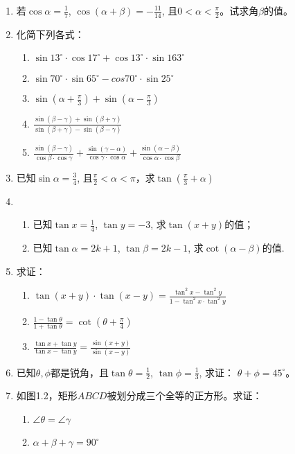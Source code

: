 \begin{enumerate}
\item 若$\cos\alpha=\frac{1}{7}$, $\cos(\alpha+\beta)=-\frac{11}{14}$, 且$0<\alpha<\frac{\pi}{2}$。试求角$\beta$的值。

\item 化简下列各式：
\begin{enumerate}
    \item $\sin13^{\circ}\cdot\cos17^{\circ}+\cos13^{\circ}\cdot \sin163^{\circ}$
    \item $\sin70^{\circ}\cdot\sin65^{\circ}-cos70^{\circ}\cdot\sin25^{\circ}$
    \item $\sin\left(\alpha+\frac{\pi}{3}\right)+\sin\left(\alpha-\frac{\pi}{3}\right)$
    \item $\frac{\sin(\beta-\gamma)+\sin(\beta+\gamma)}{\sin(\beta+\gamma)-\sin(\beta-\gamma)}$
    \item $\frac{\sin(\beta-\gamma)}{\cos\beta\cdot \cos\gamma}+\frac{\sin(\gamma-\alpha)}{\cos\gamma\cdot \cos\alpha}+\frac{\sin(\alpha-\beta)}{\cos\alpha\cdot \cos\beta}$
\end{enumerate}

\item 已知$\sin\alpha=\frac{3}{4}$, 且$\frac{\pi}{2}<\alpha<\pi$，求$\tan\left(\frac{\pi}{3}+\alpha\right)$
\item \begin{enumerate}
    \item 已知$\tan x=\frac{1}{4}$, $\tan y=-3$, 求$\tan(x+y)$的值；
    \item 已知$\tan \alpha=2k+1$, $\tan\beta=2k-1$, 求$\cot(\alpha-\beta)$的值.
\end{enumerate}

\item 求证：
\begin{enumerate}
    \item $\tan(x+y)\cdot \tan(x-y)=\frac{\tan^2 x-\tan^2 y}{1-\tan^2 x\cdot \tan^2 y}$
    \item $\frac{1-\tan\theta}{1+\tan\theta}=\cot\left(\theta+\frac{\pi}{4}\right)$
\item $\frac{\tan x+\tan y}{\tan x-\tan y}=\frac{\sin(x+y)}{\sin(x-y)}$
\end{enumerate}

\item 已知$\theta, \phi$都是锐角，且$\tan \theta=\frac{1}{2}$, $\tan\phi=\frac{1}{3}$, 求证：
$\theta+\phi=45^{\circ}$。

\item 如图1.2，矩形$ABCD$被划分成三个全等的正方形。求证：
\begin{enumerate}
    \item $\angle \theta=\angle \gamma$
    \item $\alpha+\beta+\gamma=90^{\circ}$
\end{enumerate}


\end{enumerate}
